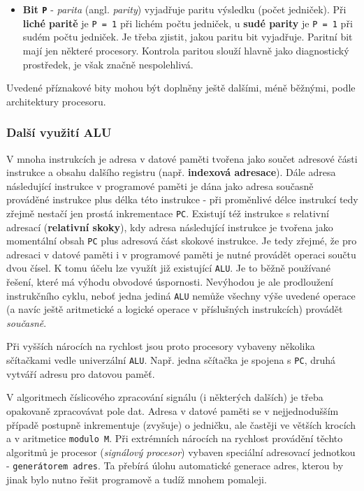 \begin{itemize}
          \item \textbf{Bit \texttt{P}} - \emph{parita} (angl. \emph{parity}) vyjadřuje paritu     
                výsledku (počet jedniček). Při \textbf{liché paritě} je \texttt{P = 1} při lichém 
                počtu jedniček, u \textbf{sudé parity} je \texttt{P = 1} při sudém počtu jedniček. 
                Je třeba zjistit, jakou paritu bit vyjadřuje. Paritní bit mají jen některé 
                procesory. Kontrola paritou slouží hlavně jako diagnostický prostředek, je však 
                značně nespolehlivá. 
        \end{itemize}        
        
        Uvedené příznakové bity mohou být doplněny ještě dalšími, méně běžnými, podle architektury procesoru.
      
      \subsubsection{Další využití ALU}
        V mnoha instrukcích je adresa v datové paměti tvořena jako součet adresové části instrukce 
        a obsahu dalšího registru (např. \textbf{indexová adresace}). Dále adresa následující 
        instrukce v programové paměti je dána jako adresa současně prováděné instrukce plus délka 
        této instrukce - při proměnlivé délce instrukcí tedy zřejmě nestačí jen prostá inkrementace 
        \texttt{PC}. Existují též instrukce s relativní adresací (\textbf{relativní skoky}), kdy 
        adresa následující instrukce je tvořena jako momentální obsah \texttt{PC} plus adresová 
        část skokové instrukce. Je tedy zřejmé, že pro adresaci v datové paměti i v programové 
        paměti je nutné provádět operaci součtu dvou čísel. K tomu účelu lze využít již existující 
        \texttt{ALU}. Je to běžně používané řešení, které má výhodu obvodové úspornosti. Nevýhodou 
        je ale prodloužení instrukčního cyklu, neboť jedna jediná \texttt{ALU} nemůže  všechny výše 
        uvedené operace (a navíc ještě aritmetické a logické operace v příslušných instrukcích) 
        provádět \emph{současně}.
        
        Při vyšších nárocích na rychlost jsou proto procesory vybaveny několika sčítačkami vedle 
        univerzální \texttt{ALU}. Např. jedna sčítačka je spojena s \texttt{PC}, druhá vytváří 
        adresu pro datovou paměť.
        
        V algoritmech číslicového zpracování signálu (i některých dalších) je třeba opakovaně 
        zpracovávat pole dat. Adresa v datové paměti se v nejjednodušším případě postupně 
        inkrementuje (zvyšuje) o jedničku, ale častěji ve větších krocích a v aritmetice 
        \texttt{modulo M}. Při extrémních nárocích na rychlost provádění těchto algoritmů je 
        procesor (\emph{signálový procesor}) vybaven speciální adresovací jednotkou - 
        \texttt{generátorem adres}. Ta přebírá úlohu automatické generace adres, kterou by jinak 
        bylo nutno řešit programově a tudíž mnohem pomaleji.
      
